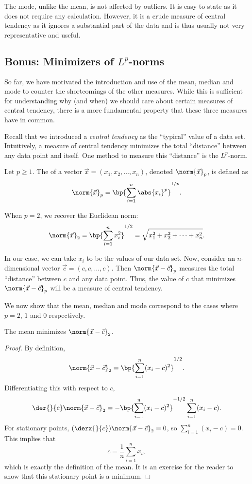 The mode, unlike the mean, is not affected by outliers. It is easy to state as it does not require any calculation. However, it is a crude measure of central tendency as it ignores a substantial part of the data and is thus usually not very representative and useful.

\subsection{Bonus: Minimizers of \texorpdfstring{$L^p$}{Lp}-norms}

So far, we have motivated the introduction and use of the mean, median and mode to counter the shortcomings of the other measures. While this is sufficient for understanding why (and when) we should care about certain measures of central tendency, there is a more fundamental property that these three measures have in common.

Recall that we introduced a \emph{central tendency} as the ``typical'' value of a data set. Intuitively, a measure of central tendency minimizes the total ``distance'' between any data point and itself. One method to measure this ``distance'' is the $L^p$-norm.

\begin{definition}
    Let $p \geq 1$. The  of a vector $\vec x = (x_1, x_2, \dots, x_n)$, denoted $\norm{\vec x}_p$, is defined as \[\norm{\vec x}_p = \bp{\sum_{i = 1}^n \abs{x_i}^p}^{1/p}.\]
\end{definition}

\begin{example}
    When $p = 2$, we recover the Euclidean norm: \[\norm{\vec x}_2 = \bp{\sum_{i = 1}^n x_i^2}^{1/2} = \sqrt{x_1^2 + x_2^2 + \dots + x_n^2}.\]
\end{example}

In our case, we can take $x_i$ to be the values of our data set. Now, consider an $n$-dimensional vector $\vec c = (c, c, \dots, c)$. Then $\norm{\vec x - \vec c}_p$ measures the total ``distance'' between $c$ and any data point. Thus, the value of $c$ that minimizes $\norm{\vec x - \vec c}_p$ will be a measure of central tendency.

We now show that the mean, median and mode correspond to the cases where $p = 2$, $1$ and $0$ respectively.

\begin{proposition}
    The mean minimizes $\norm{\vec x - \vec c}_2$.
\end{proposition}
\begin{proof}
    By definition, \[\norm{\vec x - \vec c}_2 = \bp{\sum_{i = 1}^n (x_i - c)^2}^{1/2}.\] Differentiating this with respect to $c$, \[\der{}{c} \norm{\vec x - \vec c}_2 = -\bp{\sum_{i = 1}^n (x_i - c)^2}^{-1/2} \sum_{i = 1}^n (x_i - c).\] For stationary points, $(\derx{}{c}) \norm{\vec x - \vec c}_2 = 0$, so $\sum_{i = 1}^n (x_i - c) = 0$. This implies that \[c = \frac1n \sum_{i = 1}^n x_i,\] which is exactly the definition of the mean. It is an exercise for the reader to show that this stationary point is a minimum.
\end{proof}

